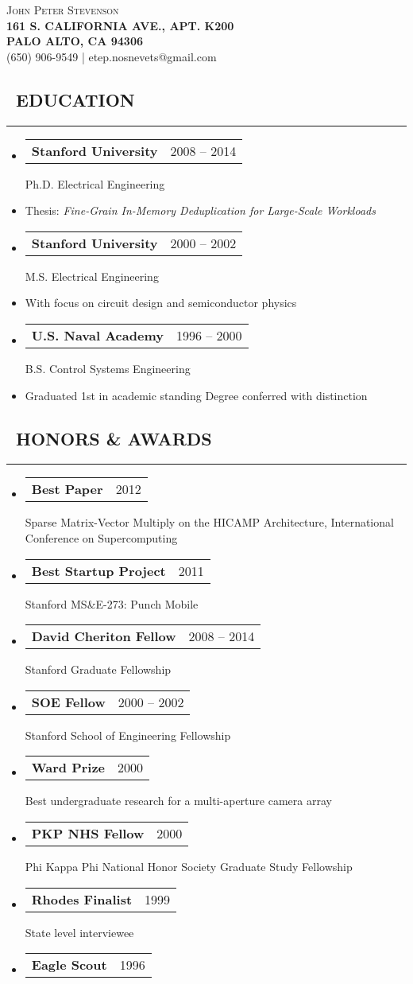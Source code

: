 \documentclass[10pt,letterpaper]{article}
\makeatletter
\newenvironment{resumesection}[1]
{%
    \subsection*{\ \textcolor{light-gray}{#1} }
    \vspace{-0.4em}
    \begin{samepage}
    \hrule
    \end{samepage}
    \vspace{+0.4em}
    \begin{itemize}[leftmargin=0.15cm]
        \parskip=0.1em
}%
{%
    \end{itemize}
}%
\newcommand{\myitem}[1] {
    \item[] \textcolor{dark-gray}{#1}
}
\newcommand{\headertri}[3] {
    \item[] \begin{tabular*}{\linewidth}{l@{\extracolsep{\fill}}r}
    \textbf{#1} & #2 \\
    \end{tabular*}
    #3
}
\newcommand{\lminiw}{0.375}
\makeatother
\begin{document}
\begin{center}
{\huge{ \textsc{ { {{\mdseries John Peter}} {Stevenson} }}}} \\
\vspace{0.5em}
\textcolor{light-gray}{
\footnotesize{\textbf{161 S. CALIFORNIA AVE., APT. K200}}  \\
\footnotesize{\textbf{PALO ALTO, CA 94306              }}  \\
\footnotesize{{(650) 906-9549} | {etep.nosnevets@gmail.com}}
}
\end{center}

\begin{minipage}[t]{\lminiw\textwidth}
\begin{resumesection}{EDUCATION}
    \headertri
    {Stanford University}
    {2008 -- 2014}
    {Ph.D. Electrical Engineering}
    \myitem
    {Thesis: \textit{Fine-Grain In-Memory Deduplication for Large-Scale Workloads}}
    
    \headertri
    {Stanford University}
    {2000 -- 2002}
    {M.S. Electrical Engineering}
    \myitem
    {With focus on circuit design and semiconductor physics}
    
    \headertri
    {U.S. Naval Academy}
    {1996 -- 2000}
    {B.S. Control Systems Engineering}
    \myitem
    {Graduated 1st in academic standing \newline Degree conferred with distinction}
\end{resumesection}

\begin{resumesection}{HONORS \& AWARDS}
    \headertri
    {Best Paper}
    {2012}
    {Sparse Matrix-Vector Multiply on the {{HICAMP}} Architecture, International Conference on Supercomputing}
    
    \headertri
    {Best Startup Project}
    {2011}
    {Stanford MS\&E-273: Punch Mobile}
    
    \headertri
    {David Cheriton Fellow}
    {2008 -- 2014}
    {Stanford Graduate Fellowship}
    
    \headertri
    {SOE Fellow}
    {2000 -- 2002}
    {Stanford School of Engineering Fellowship}
    
    \headertri
    {Ward Prize}
    {2000}
    {Best undergraduate research for a multi-aperture camera array}
    
    \headertri
    {PKP NHS Fellow}
    {2000}
    {Phi Kappa Phi National Honor Society Graduate Study Fellowship}
    
    \headertri
    {Rhodes Finalist}
    {1999}
    {State level interviewee}
    
    \headertri
    {Eagle Scout}
    {1996}
    {}
\end{resumesection}

\end{minipage}
\end{document}

